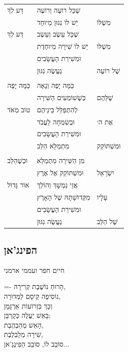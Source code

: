 \documentclass[11pt,twoside]{article}
\newcommand{\instruction}[1]{%
\ifhmode\else\noindent\fi%
{\plain\tiny{#1}}%
}
\begin{document}
{{{\normalsize\centering%
\begin{tabularx}{\textwidth}{@{}>{\raggedleft\arraybackslash}X
                             >{\raggedleft\arraybackslash}p{}
                             >{\raggedright\arraybackslash}X@{}}
דַּע לְךָ &
שֶׁכָּל רוֹעֶה וְרוֹעֶה & \\
& יֵשׁ לוֹ נִגּוּן מְיוּחָד &
מִשֶׁלּוֹ\\
דַּע לְךָ &
שֶׁכָּל עֵשֶׂב וְעֵשֶׂב & \\
& יֵשׁ לוֹ שִׁירָה מְיוּחֶדֶת &
מִשֶׁלּוֹ\\
& וּמִשִׁירַת הָעֲשָׂבִים & \\
& נַעֲשֶׂה נִגּוּן &
שֶׁל רוֹעֶה \\
& & \\
כַּמָּה יָפֶה &
כַּמָּה יָפֶה וְנָאֶה & \\
& כְּשֶׁשׁוֹמְעִים הַשִּׁירָה &
שֶׁלָּהֶם \\
טוֹב מְאֹד &
לְהִתְפַּלֵּל בֵּינֵיהֶם & \\
& וּבְשִׂמְחָה לַעֲבֹד &
אֶת ה׳ \\
& וּמִשִׁירַת הָעֲשָׂבִים & \\
& מִתְמַלֵּא הַלֵּב &
וּמִשְׁתּוֹקֵק \\
& & \\
וּכְשֶׁהַלֵּב &
מִן הַשִּׁירָה מִתְמַלֵּא & \\
& וּמִשְׁתּוֹקֵק אֶל אֶרֶץ &
יִשְׂרָאֵל \\
אוֹר גָּדוֹל &
אֲזַי נִמְשָׁךְ וְהוֹלֵךְ & \\
& מִקְּדוּשָׁתָהּ שֶׁל הָאָרֶץ &
עָלָיו \\
& וּמִשִׁירַת הָעֲשָׂבִים & \\
& נַעֲשֶׂה נִגּוּן &
שֶׁל הַלֵּב \\
\end{tabularx}%
}

\newpage

\subsection{הפינג'אן}
\vspace{-\baselineskip}%
{\centering\instruction{חיים חפר ועממי ארמני}\par}

{\centering%
\footnotesize%
\lineskiplimit=-\maxdimen%
הָרוּחַ נוֹשֶׁבֶת קְרִירָה,\\
נוֹסִיפָה קֵיסָם לַמְּדוּרָה,\\
וְכָךְ בִּזְרוֹעוֹת אַרְגָּמָן\\
בָּאֵשׁ יַעֲלֶה כְּקָרְבָּן;\\
הָאֵשׁ מְהַבְהֶבֶת,\\
שִׁירָה מְלַבְלֶבֶת,\\
סוֹבֵב לוֹ, סוֹבֵב הַפִינְגָ'אן...\par
}

}}
\end{document}
